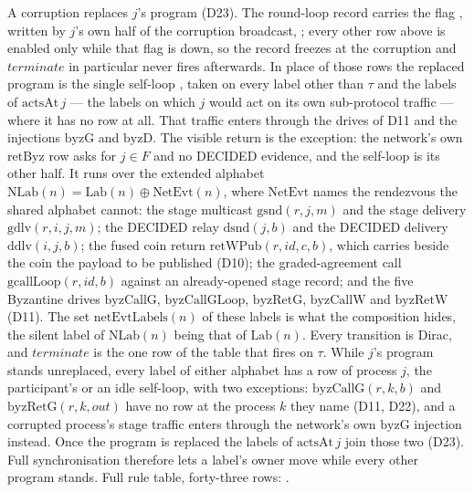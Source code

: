 \begin{definition}
  A corruption replaces $j$'s program (D23).
  The round-loop record carries the flag , written by $j$'s own half of the corruption broadcast, ; every other row above is enabled only while that flag is down, so the record freezes at the corruption and $terminate$ in particular never fires afterwards.
  In place of those rows the replaced program is the single self-loop , taken on every label other than $\tau$ and the labels of $\mathrm{actsAt}\,j$ --- the labels on which $j$ would act on its own sub-protocol traffic --- where it has no row at all.
  That traffic enters through the drives of D11 and the injections $\mathrm{byzG}$ and $\mathrm{byzD}$.
  The visible return is the exception: the network's own $\mathrm{retByz}$ row asks for $j \in F$ and no DECIDED evidence, and the self-loop is its other half.
  It runs over the extended alphabet $\mathrm{NLab}(n) = \mathrm{Lab}(n) \oplus \mathrm{NetEvt}(n)$, where $\mathrm{NetEvt}$ names the rendezvous the shared alphabet cannot: the stage multicast $\mathrm{gsnd}(r,j,m)$ and the stage delivery $\mathrm{gdlv}(r,i,j,m)$; the DECIDED relay $\mathrm{dsnd}(j,b)$ and the DECIDED delivery $\mathrm{ddlv}(i,j,b)$; the fused coin return $\mathrm{retWPub}(r,id,c,b)$, which carries beside the coin the payload to be published (D10); the graded-agreement call $\mathrm{gcallLoop}(r,id,b)$ against an already-opened stage record; and the five Byzantine drives $\mathrm{byzCallG}$, $\mathrm{byzCallGLoop}$, $\mathrm{byzRetG}$, $\mathrm{byzCallW}$ and $\mathrm{byzRetW}$ (D11).
  The set $\mathrm{netEvtLabels}(n)$ of these labels is what the composition hides, the silent label of $\mathrm{NLab}(n)$ being that of $\mathrm{Lab}(n)$.
  Every transition is Dirac, and $terminate$ is the one row of the table that fires on $\tau$.
  While $j$'s program stands unreplaced, every label of either alphabet has a row of process $j$, the participant's or an idle self-loop, with two exceptions: $\mathrm{byzCallG}(r,k,b)$ and $\mathrm{byzRetG}(r,k,out)$ have no row at the process $k$ they name (D11, D22), and a corrupted process's stage traffic enters through the network's own $\mathrm{byzG}$ injection instead.
  Once the program is replaced the labels of $\mathrm{actsAt}\,j$ join those two (D23).
  Full synchronisation therefore lets a label's owner move while every other program stands.
  Full rule table, forty-three rows: .
\end{definition}
